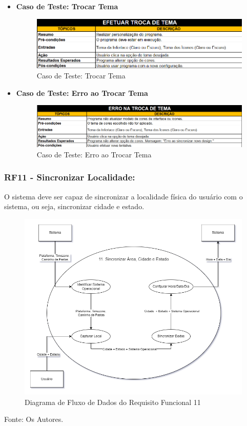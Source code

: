 \documentclass[a4paper,12pt]{article}
\begin{document}
\pagebreak
\begin{itemize}
	\item\textbf{Caso de Teste: Trocar Tema}
	\begin{figure}[H]
		\centering
		\includegraphics[scale=0.65]{UnitTest/trueCase/theme.png}
		\caption{Caso de Teste: Trocar Tema}
	\end{figure}

	\item\textbf{Caso de Teste: Erro ao Trocar Tema}
	\begin{figure}[H]
		\centering
		\includegraphics[scale=0.65]{UnitTest/falseCase/theme.png}
		\caption{Caso de Teste: Erro ao Trocar Tema}
	\end{figure}
\end{itemize}

\pagebreak
\subsubsection{RF11 - Sincronizar Localidade:}
O sistema deve ser capaz de sincronizar a localidade física do usuário com o sistema, ou seja, sincronizar cidade e estado.
\begin{figure}[H]
	\centering
	\includegraphics[scale=0.45]{DFDs/RF11.drawio.png}
	\caption{Diagrama de Fluxo de Dados do Requisito Funcional 11}
\end{figure}
\noindent Fonte: Os Autores.
\end{document}
